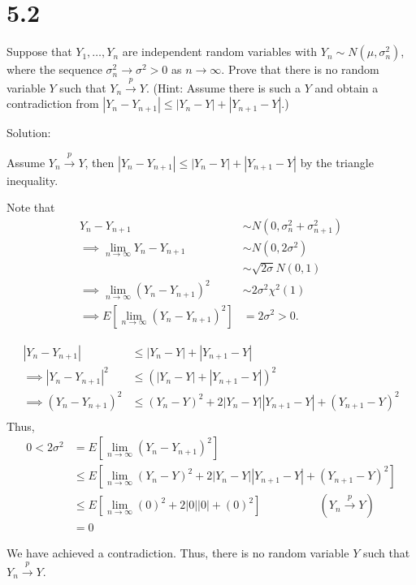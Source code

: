 \documentclass[
  letterpaper,
  DIV=11,
  numbers=noendperiod]{scrreprt}
\begin{document}
\newpage

\hypertarget{section-27}{%
\section{5.2}\label{section-27}}

Suppose that \(Y_1, \dots, Y_n\) are independent random variables with
\(Y_n \sim N(\mu,\sigma_n^2)\), where the sequence
\(\sigma_n^2 \to \sigma^2 >0\) as \(n \to \infty\). Prove that there is
no random variable \(Y\) such that \(Y_n \overset{p}{\to}Y\). (Hint:
Assume there is such a \(Y\) and obtain a contradiction from
\(|Y_n-Y_{n+1}| \leq |Y_n-Y|+|Y_{n+1}-Y|\).)

Solution:

Assume \(Y_n \overset{p}{\to}Y\), then
\(|Y_n-Y_{n+1}| \leq |Y_n-Y|+|Y_{n+1}-Y|\) by the triangle inequality.

Note that \[\begin{aligned}
Y_n - Y_{n+1} &\sim N(0,\sigma_n^2+ \sigma_{n+1}^2) \\
\implies \lim_{n \to \infty} Y_n - Y_{n+1} &\sim N(0,2\sigma^2) \\
&\sim \sqrt{2\sigma}N(0,1) \\
\implies \lim_{n \to \infty} (Y_n - Y_{n+1})^2 &\sim {2\sigma^2}\chi^2(1) \\
\implies E \left[\lim_{n \to \infty}(Y_n - Y_{n+1})^2\right] &= {2\sigma^2} > 0.
\end{aligned}
\]

\[
\begin{aligned}
|Y_n-Y_{n+1}| &\leq |Y_n-Y|+|Y_{n+1}-Y| \\
\implies |Y_n-Y_{n+1}|^2 &\leq (|Y_n-Y|+|Y_{n+1}-Y|)^2 \\
\implies (Y_n-Y_{n+1})^2 &\leq (Y_n-Y)^2+2|Y_n-Y||Y_{n+1}-Y|+(Y_{n+1}-Y)^2 \\
\end{aligned}
\] Thus, \[
\begin{aligned}
0 < {2 \sigma^2} &= E\left[\lim_{n\to \infty}(Y_n-Y_{n+1})^2\right] \\
&\leq E\left[\lim_{n\to \infty}(Y_n-Y)^2+2|Y_n-Y||Y_{n+1}-Y|+(Y_{n+1}-Y)^2\right] \\
&\leq E\left[\lim_{n\to \infty}(0)^2+2|0||0|+(0)^2\right] ~~~~~~~~~~~~~~~~~~~~~~~(Y_n \overset p \to Y) \\
&= 0
\end{aligned}
\]

We have achieved a contradiction. Thus, there is no random variable
\(Y\) such that \(Y_n \overset{p}{\to}Y\).
\end{document}
